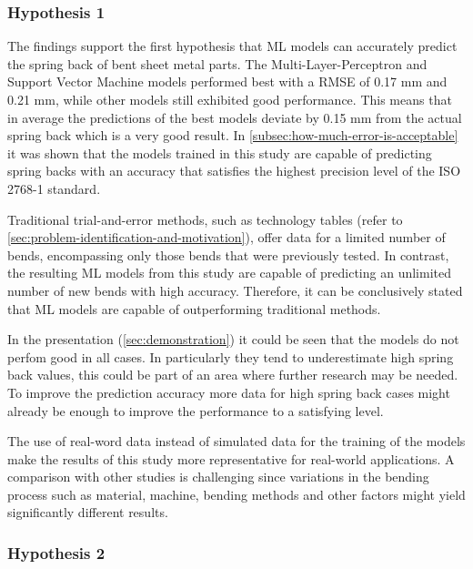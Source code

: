 \subsubsection{Hypothesis 1}
The findings support the first hypothesis that \ac{ML} models can accurately predict the spring back of bent sheet
metal parts.
The Multi-Layer-Perceptron and Support Vector Machine models performed best with a RMSE of 0.17 mm and 0.21 mm, while
other models
still exhibited good performance.
This means that in average the predictions of the best models deviate by 0.15 mm from the actual spring back which is
a very good result.
In \cref{subsec:how-much-error-is-acceptable} it was shown that the models trained in this study are
capable of predicting spring backs with an accuracy that satisfies the highest precision level of the ISO 2768-1
standard.

Traditional trial-and-error methods, such as technology tables (refer to
\cref{sec:problem-identification-and-motivation}), offer data for a limited number of bends, encompassing
only those bends that were previously tested.
In contrast, the resulting \ac{ML} models from this study are capable of predicting an unlimited number of new bends
with high accuracy.
Therefore, it can be conclusively stated that \ac{ML} models are capable of outperforming traditional methods.

In the presentation (\cref{sec:demonstration}) it could be seen that the models do not perfom good in all cases.
In particularly they tend to underestimate high spring back values, this could be part of an area where further
research
may be needed.
To improve the prediction accuracy more data for high spring back cases might already be enough to improve the
performance to a satisfying level.

The use of real-word data instead of simulated data for the training of the models make the results of this study
more representative for real-world applications.
A comparison with other studies is challenging since variations in the bending process such as material, machine,
bending methods and other factors might yield significantly different results.

\subsubsection{Hypothesis 2}

